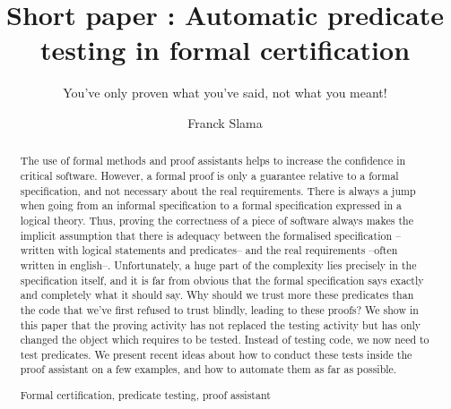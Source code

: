 \documentclass[runningheads,a4paper]{llncs}
\newcommand{\keywords}[1]{\par\addvspace\baselineskip
\noindent\keywordname\enspace\ignorespaces#1}
\begin{document}
\mainmatter  %

\title{Short paper : Automatic predicate testing in formal certification}
\subtitle{You've only proven what you've said, not what you meant!}



\author{Franck Slama\\
         }


\maketitle


\begin{abstract}
The use of formal methods and proof assistants helps to increase the confidence in critical software. However, a formal proof is only a guarantee relative to a formal specification, and not necessary about the real requirements. There is always a jump when going from an informal specification to a formal specification expressed in a logical theory. Thus, proving the correctness of a piece of software always makes the implicit assumption that there is adequacy between the formalised specification --written with logical statements and predicates-- and the real requirements --often written in english--. Unfortunately, a huge part of the complexity lies precisely in the specification itself, and it is far from obvious that the formal specification says exactly and completely what it should say. Why should we trust more these predicates than the code that we've first refused to trust blindly, leading to these proofs? We show in this paper that the proving activity has not replaced the testing activity but has only changed the object which requires to be tested. Instead of testing code, we now need to test predicates. We present recent ideas about how to conduct these tests inside the proof assistant on a few examples, and how to automate them as far as possible.

\keywords{Formal certification, predicate testing, proof assistant}
\end{abstract}




















\nocite{DeMillo1979}


\end{document}
